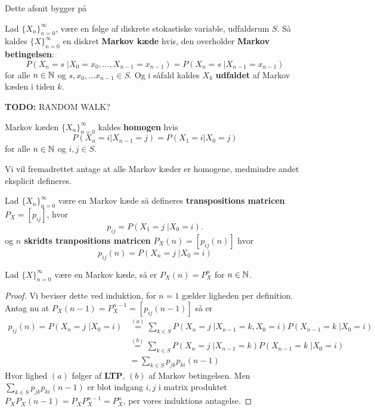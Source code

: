 Dette afsnit bygger på  \cite{sandsynlighedsBog}
\begin{defn}
Lad $\{X_n\}_{n = 0}^\infty$, være en følge af diskrete stokastiske variable, udfaldsrum $S$. Så kaldes $\{X\}_{n = 0}^\infty$ en diskret \textbf{Markov kæde} hvis, den overholder \textbf{Markov betingelsen}:
\begin{equation*}
    P(X_n = s \;| X_0 = x_0, \ldots, X_{n - 1} = x_{n - 1}) = P(X_n = s \;| X_{n - 1} = x_{n - 1})
\end{equation*}
for alle $n \in \mathbb{N}$ og $s, x_0, \ldots x_{n - 1} \in S$. Og i såfald kaldes $X_k$ \textbf{udfaldet} af Markov kæden i tiden $k$.
\end{defn}
\begin{exmp}
\textbf{TODO:} RANDOM WALK?
\end{exmp}
\begin{defn}
Markov kæden $\{X_n\}_{n = 0}^\infty$ kaldes \textbf{homogen} hvis 
\begin{equation*}
    P(X_n = i | X_{n - 1} = j) = P(X_1 = i | X_0 = j)
\end{equation*}
for alle $n \in \mathbb{N}$ og $i, j \in S$. 
\end{defn}
Vi vil fremadrettet antage at alle Markov kæder er homogene, medmindre andet eksplicit defineres.
\begin{defn}
Lad $\{X_n\}_{n = 0}^\infty$ være en Markov kæde så defineres \textbf{transpositions matricen} $P_X = [p_{ij}]$, hvor 
\begin{equation*}
    p_{ij} = P(X_1 = j \;| X_0 = i).
\end{equation*}
og \textbf{$n$ skridts tranpositions matricen} $P_X(n) = [p_{ij}(n)]$ hvor 
\begin{equation*}
    p_{ij}(n) = P(X_n = j \;| X_0 = i)
\end{equation*}
\end{defn}

\begin{thm}
Lad $\{X\}_{n = 0}^\infty$ være en Markov kæde, så er $P_X(n) = P_X^n$ for $n \in \mathbb{N}$.
\end{thm}
\begin{proof}
Vi beviser dette ved induktion, for $n = 1$ gælder ligheden per definition. Antag nu at $P_X(n - 1) = P_X^{n - 1} = [p_{ij}(n - 1)]$ så er 
\begin{align*} 
    p_{ij}(n) = P(X_n = j \;| X_0 = i) &\stackrel{(a)}= \sum_{k \in S} P(X_n = j\; | X_{n - 1} = k, X_0 = i) P(X_{n - 1} = k\; | X_0 = i) \\
    &\stackrel{(b)}= \sum_{k \in S} P(X_n = j\; | X_{n - 1} = k) P(X_{n - 1} = k\; | X_0 = i) \\
    &= \sum_{k \in S} p_{jk}p_{ki}(n - 1) 
\end{align*}
Hvor lighed $(a)$ følger af \textbf{LTP}, $(b)$ af Markov betingelsen. Men $\displaystyle \sum_{k \in S} p_{jk}p_{ki}(n - 1)$ er blot indgang $i, j$ i matrix produktet $P_X P_X(n - 1) = P_X P_X^{n - 1} = P_X^n$, per vores induktions antagelse.
\end{proof}

